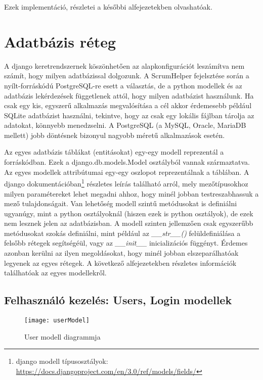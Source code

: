 Ezek implementáció, részletei a későbbi alfejezetekben olvashatóak. 

\section{Adatbázis réteg}
\label{dbmodels}

A django keretrendszernek köszönhetően az alapkonfigurációt leszámítva nem számít, hogy milyen adatbázissal dolgozunk. A ScrumHelper fejelsztése során a nyílt-forráskódú PostgreSQL-re esett a választás, de a python modellek és az adatbázis lekérdezések függetlenek attól, hogy milyen adatbázist használunk. Ha csak egy kis, egyszerű alkalmazás megvalósítása a cél akkor érdemesebb például SQLite adatbázist használni, tekintve, hogy az csak egy lokális fájlban tárolja az adatokat, könnyebb menedzselni. A PostgreSQL (a MySQL, Oracle, MariaDB mellett) jobb döntésnek bizonyul nagyobb méretű alkalmazások esetén. 

Az egyes adatbázis táblákat (entitásokat) egy-egy modell reprezentál a forráskódban. Ezek a django.db.models.Model osztályból vannak származtatva. Az egyes modellek attribútumai egy-egy oszlopot reprezentálnak a táblában. A django dokumentációban\footnote{django modell típusosztályok: \url{https://docs.djangoproject.com/en/3.0/ref/models/fields/}} részletes leírás található arról, mely mezőtípusokhoz milyen paramétereket lehet megadni ahhoz, hogy minél jobban testreszabhassuk a mező tulajdonságait. Van lehetőség modell szintű metódusokat is definiálni ugyanúgy, mint a python osztályoknál (hiszen ezek is python osztályok), de ezek nem lesznek jelen az adatbázisban. A modell szinten jellemzően csak egyszerűbb metódusokat szokás definiálni, mint például az \textit{\_\_str\_\_()} felüldefiniálása a felsőbb rétegek segítségéül, vagy az \textit{\_\_init\_\_} inicializációs függényt. Érdemes azonban kerülni az ilyen megoldásokat, hogy minél jobban elszeparálhatóak legyenek az egyes rétegek.  A következő alfejezetekben részletes információk találhatóak az egyes modellekről.

\subsection{Felhasználó kezelés: Users, Login modellek}

\begin{figure}[H]
	\centering
	\texttt{[image: userModel]}
	\caption{User modell diagrammja}
	\label{fig:usermodel}
\end{figure}

